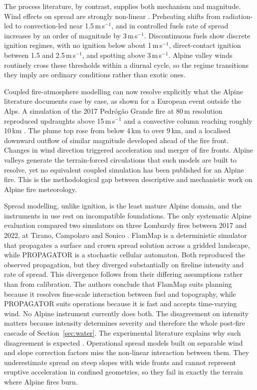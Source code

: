 \documentclass[11pt,a4paper]{article}
\begin{document}
The process literature, by contrast, supplies both mechanism and magnitude. Wind effects on spread are strongly non-linear \citep{hayajneh_wind_2026}. Preheating shifts from radiation-led to convection-led near 1.5\,m\,s$^{-1}$, and in controlled fuels rate of spread increases by an order of magnitude by 3\,m\,s$^{-1}$. Discontinuous fuels show discrete ignition regimes, with no ignition below about 1\,m\,s$^{-1}$, direct-contact ignition between 1.5 and 2.5\,m\,s$^{-1}$, and spotting above 3\,m\,s$^{-1}$. Alpine valley winds routinely cross these thresholds within a diurnal cycle, so the regime transitions they imply are ordinary conditions rather than exotic ones.

Coupled fire-atmosphere modelling can now resolve explicitly what the Alpine literature documents case by case, as shown for a European event outside the Alps. A simulation of the 2017 Pedr\'og\~ao Grande fire at 80\,m resolution reproduced updraughts above 15\,m\,s$^{-1}$ and a convective column reaching roughly 10\,km \citep{couto_numerical_2024}. The plume top rose from below 4\,km to over 9\,km, and a localised downward outflow of similar magnitude developed ahead of the fire front. Changes in wind direction triggered acceleration and merger of fire fronts. Alpine valleys generate the terrain-forced circulations that such models are built to resolve, yet no equivalent coupled simulation has been published for an Alpine fire. This is the methodological gap between descriptive and mechanistic work on Alpine fire meteorology.

Spread modelling, unlike ignition, is the least mature Alpine domain, and the instruments in use rest on incompatible foundations. The only systematic Alpine evaluation compared two simulators on three Lombardy fires between 2017 and 2022, at Tirano, Campolaro and Sonico \citep{malanchini_modeling_2025}. FlamMap is a deterministic simulator that propagates a surface and crown spread solution across a gridded landscape, while PROPAGATOR is a stochastic cellular automaton. Both reproduced the observed propagation, but they diverged substantially on fireline intensity and rate of spread. This divergence follows from their differing assumptions rather than from calibration. The authors conclude that FlamMap suits planning because it resolves fine-scale interaction between fuel and topography, while PROPAGATOR suits operations because it is fast and accepts time-varying wind. No Alpine instrument currently does both. The disagreement on intensity matters because intensity determines severity and therefore the whole post-fire cascade of Section~\ref{sec:water}. The experimental literature explains why such disagreement is expected \citep{hayajneh_wind_2026}. Operational spread models built on separable wind and slope correction factors miss the non-linear interaction between them. They underestimate spread on steep slopes with wide fronts and cannot represent eruptive acceleration in confined geometries, so they fail in exactly the terrain where Alpine fires burn.
\end{document}
